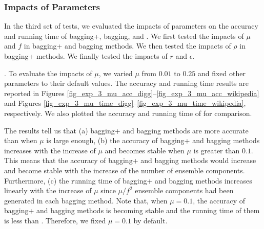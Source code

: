 \subsubsection{Impacts of Parameters}
In the third set of tests, we evaluated the impacts of parameters on
the accuracy and running time of bagging+, bagging, \NMF
and \BIGCLAM. We first tested the impacts of $\mu$ and $f$ in bagging+ and bagging methods.
We then tested the impacts of $\rho$ in bagging+ methods. We finally
tested the impacts of $r$ and $\epsilon$.


. To evaluate the impacts of $\mu$, we
varied $\mu$ from $0.01$ to $0.25$ and fixed other parameters to their
default values. The accuracy and running time results are reported in
Figures \ref{fig_exp_3_mu_acc_digg}--\ref{fig_exp_3_mu_acc_wikipedia} and Figures \ref{fig_exp_3_mu_time_digg}--\ref{fig_exp_3_mu_time_wikipedia},
respectively. We also plotted the accuracy and running time of \NMF for comparison.



The results tell us that (a) bagging+ and bagging methods are more accurate than
\NMF when $\mu$ is large enough, (b) the accuracy of bagging+ and bagging methods
increases with the increase of $\mu$ and becomes stable when $\mu$ is greater
than $0.1$. This means that the accuracy of bagging+ and bagging methods would
increase and become stable with the increase of the number of ensemble components.
Furthermore, (c) the running time of bagging+ and bagging methods increases linearly
with the increase of $\mu$ since $\mu / f^2$ ensemble components had been generated in each bagging
method. Note that, when $\mu = 0.1$, the accuracy of bagging+ and bagging methods
is becoming stable and the running time of them is less than \NMF.
Therefore, we fixed $\mu = 0.1$ by default.






